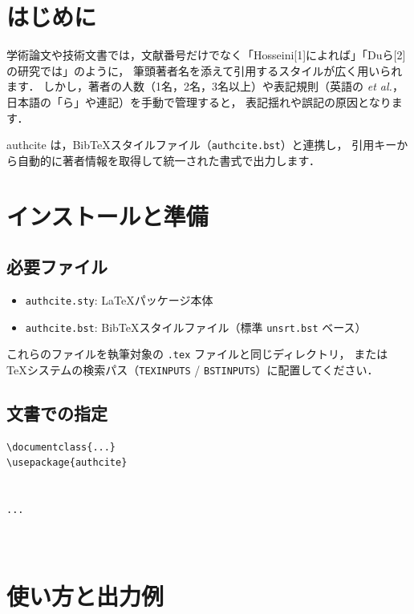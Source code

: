 \section{はじめに}
学術論文や技術文書では，文献番号だけでなく「Hosseini[1]によれば」「Duら[2]の研究では」のように，
筆頭著者名を添えて引用するスタイルが広く用いられます．
しかし，著者の人数（1名，2名，3名以上）や表記規則（英語の \textit{et al.}，日本語の「ら」や連記）を手動で管理すると，
表記揺れや誤記の原因となります．

\textsf{authcite} は，Bib\TeX スタイルファイル（\texttt{authcite.bst}）と連携し，
引用キーから自動的に著者情報を取得して統一された書式で出力します．

\section{インストールと準備}
\subsection{必要ファイル}
\begin{itemize}
  \item \texttt{authcite.sty}: \LaTeX パッケージ本体
  \item \texttt{authcite.bst}: Bib\TeX スタイルファイル（標準 \texttt{unsrt.bst} ベース）
\end{itemize}
これらのファイルを執筆対象の \texttt{.tex} ファイルと同じディレクトリ，
または \TeX システムの検索パス（\texttt{TEXINPUTS} / \texttt{BSTINPUTS}）に配置してください．

\subsection{文書での指定}
\begin{verbatim}
\documentclass{...}
\usepackage{authcite}


...



\end{verbatim}

\section{使い方と出力例}

